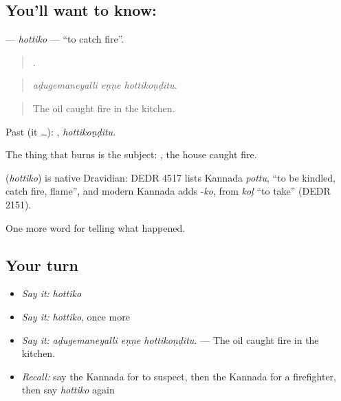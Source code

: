 \subsection*{You'll want to know: }
\textbf{} — \emph{hottiko} — \textquotedblleft{}to catch fire\textquotedblright{}.

\begin{quote}
  .
\end{quote}

\begin{quote}
\emph{aḍugemaneyalli eṇṇe hottikoṇḍitu.}
\end{quote}

\begin{quote}
The oil caught fire in the kitchen.
\end{quote}

Past (it …): , \emph{hottikoṇḍitu}.

The thing that burns is the subject:  , the house caught fire.

\begin{cousinweb}
\textbf{} (\emph{hottiko}) is native Dravidian: DEDR 4517 lists Kannada \emph{pottu}, \textquotedblleft{}to be kindled, catch fire, flame\textquotedblright{}, and modern Kannada adds -\emph{ko}, from \emph{koḷ} \textquotedblleft{}to take\textquotedblright{} (DEDR 2151).
\end{cousinweb}

\begin{grammarlens}[title={What you've built}]
One more word for telling what happened.
\end{grammarlens}

\subsection*{Your turn}
\begin{itemize}
\raggedright
  \item \emph{Say it:} \emph{hottiko}
  \item \emph{Say it:} \emph{hottiko}, once more
  \item \emph{Say it:} \emph{aḍugemaneyalli eṇṇe hottikoṇḍitu.} — The oil caught fire in the kitchen.
  \item \emph{Recall:} say the Kannada for to suspect, then the Kannada for a firefighter, then say \emph{hottiko} again
\end{itemize}


